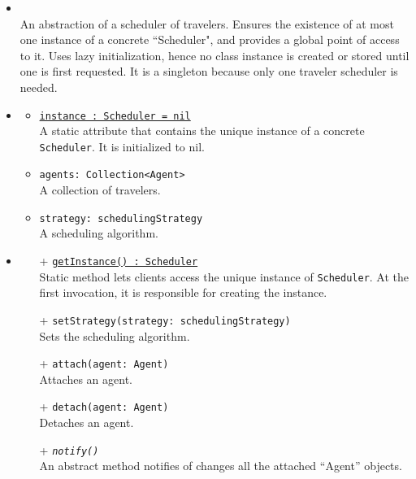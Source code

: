 \begin{itemize}
  \item \textbf{\descr} \\
  An abstraction of a scheduler of travelers.
  Ensures the existence of at most one instance of a concrete ``Scheduler", 
  and provides a global point of access to it.
  Uses lazy initialization, hence no class instance is created 
  or stored until one is first requested.
  It is a singleton because only one traveler scheduler is needed.
  \item \textbf{\attrs}
  \begin{itemize}
    \item \texttt{\underline{instance : Scheduler = nil}} \\
    A static attribute that contains the unique instance 
    of a concrete \texttt{Scheduler}. It is initialized to nil.
    \item \texttt{agents: Collection<Agent>} \\
	A collection of travelers.
	\item \texttt{strategy: schedulingStrategy} \\
	A scheduling algorithm.
  \end{itemize}
  \item \textbf{\ops}
  \begin{itemize}
    \item[+] \texttt{\underline{getInstance() : Scheduler}} \\
    Static method lets clients access the unique instance 
    of \texttt{Scheduler}. At the first invocation, it is responsible 
    for creating the instance.
    \item[+] \texttt{setStrategy(strategy: schedulingStrategy)} \\
    Sets the scheduling algorithm.
    \item[+] \texttt{attach(agent: Agent)} \\
    Attaches an agent.
	\item[+] \texttt{detach(agent: Agent)} \\
	Detaches an agent.
	\item[+] \texttt{\textit{notify()}} \\
	An abstract method notifies of changes all the attached ``Agent'' objects.
  \end{itemize}
\end{itemize}
